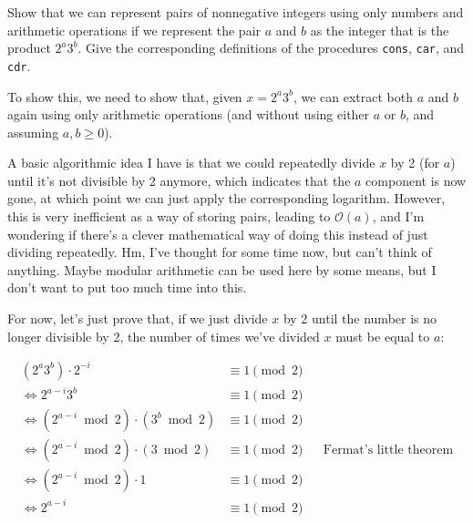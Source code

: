 \documentclass{../../sicp}
\date{September 6, 2024}
\begin{document}
\maketitle

\begin{displayquote}
	Show that we can represent pairs of nonnegative integers using only numbers and arithmetic operations if we represent the pair $a$ and $b$ as the integer that is the product $2^a 3^b$.
	Give the corresponding definitions of the procedures \texttt{cons}, \texttt{car}, and \texttt{cdr}.
\end{displayquote}

To show this, we need to show that, given $x = 2^a 3^b$, we can extract both $a$ and $b$ again using only arithmetic operations (and without using either $a$ or $b$, and assuming $a, b \geq 0$).

A basic algorithmic idea I have is that we could repeatedly divide $x$ by 2 (for $a$) until it's not divisible by 2 anymore, which indicates that the $a$ component is now gone, at which point we can just apply the corresponding logarithm.
However, this is very inefficient as a way of storing pairs, leading to $\mathcal{O}(a)$, and I'm wondering if there's a clever mathematical way of doing this instead of just dividing repeatedly.
Hm, I've thought for some time now, but can't think of anything.
Maybe modular arithmetic can be used here by some means, but I don't want to put too much time into this.

For now, let's just prove that, if we just divide $x$ by 2 until the number is no longer divisible by 2, the number of times we've divided $x$ must be equal to $a$:

\begin{align*}
	(2^a 3^b) \cdot 2^{-i}                                        & \equiv 1 \pmod{2}                                     \\
	\Leftrightarrow 2^{a-i} 3^b                                   & \equiv 1 \pmod{2}                                     \\
	\Leftrightarrow (2^{a-i} \bmod 2) \cdot (3^b \bmod 2)         & \equiv 1 \pmod{2}                                     \\
	\Leftrightarrow (2^{a-i} \bmod 2) \cdot (3 \bmod 2)           & \equiv 1 \pmod{2} &  & \text{Fermat's little theorem} \\
	\Leftrightarrow (2^{a-i} \bmod 2) \cdot 1                     & \equiv 1 \pmod{2}                                     \\
	\Leftrightarrow                                       2^{a-i} & \equiv 1 \pmod{2}
\end{align*}
\end{document}
